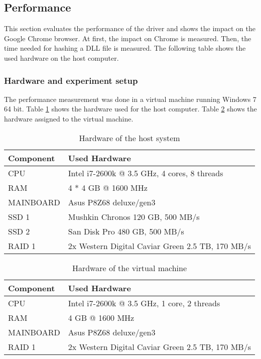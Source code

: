 \subsection{Performance}
This section evaluates the performance of the driver and shows the impact on the Google Chrome browser. At first, the impact on Chrome is measured. Then, the time needed for hashing a DLL file is measured. The following table shows the used hardware on the host computer.

\subsubsection{Hardware and experiment setup}
The performance measurement was done in a virtual machine running Windows 7 64 bit. Table \ref{fig:hardware_host} shows the hardware used for the host computer. Table \ref{fig:hardware_vm} shows the hardware assigned to the virtual machine.
\def\arraystretch{1.1}%

\begin{table}[]
\centering
\begin{tabular}{| l | l |}
\hline
Component & Used Hardware \\ \hline
CPU & Intel i7-2600k @ 3.5 GHz, 4 cores, 8 threads \\ \hline
RAM & 4 * 4 GB @ 1600 MHz \\ \hline
MAINBOARD & Asus P8Z68 deluxe/gen3 \\ \hline
SSD 1 & Mushkin Chronos 120 GB, 500 MB/s \\ \hline
SSD 2 & San Disk Pro 480 GB, 500 MB/s \\ \hline
RAID 1 & 2x Western Digital Caviar Green 2.5 TB, 170 MB/s \\ \hline
\end{tabular}
\caption{Hardware of the host system}
\label{fig:hardware_host}
\end{table}

\begin{table}[]
\centering
\begin{tabular}{| l | l |}
\hline
Component & Used Hardware \\ \hline
CPU & Intel i7-2600k @ 3.5 GHz, 1 core, 2 threads \\ \hline
RAM & 4 GB @ 1600 MHz \\ \hline
MAINBOARD & Asus P8Z68 deluxe/gen3 \\ \hline
RAID 1 & 2x Western Digital Caviar Green 2.5 TB, 170 MB/s \\ \hline
\end{tabular}
\caption{Hardware of the virtual machine}
\label{fig:hardware_vm}
\end{table}
